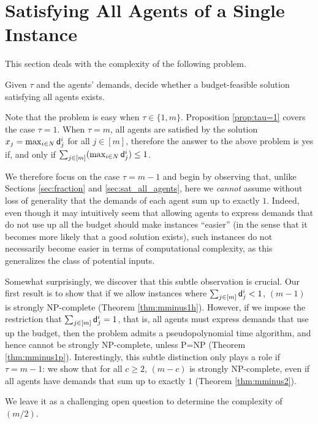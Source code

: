 \documentclass{article}
\begin{document}
\section{Satisfying All Agents of a Single Instance} 

\label{sec:social_welfare_max}

This section deals with the complexity of the following problem. 
\begin{definition}[\AAS$(\tau)$] Given $\tau$ and the agents' demands, decide whether a budget-feasible solution satisfying all agents exists.
\end{definition}


Note that the problem is easy when $\tau \in \{1,m\}$.  Proposition \ref{prop:tau=1} covers the case 
$\tau=1$. When $\tau=m$, all agents are satisfied by  
the solution $x_j=\max_{i \in N} {\sf d}_j^i$ for all $j \in [m]$, therefore the answer to the above problem is yes if, and only if $\sum_{j\in[m]} ( \max_{i \in N} {\sf d}_j^i ) \le 1$.

We therefore focus on the case $\tau=m-1$ and begin by observing that, unlike Sections \ref{sec:fraction} and \ref{sec:sat_all_agents}, here we \emph{cannot} assume without loss of generality that the demands of each agent sum up to exactly $1$. Indeed, even though it may intuitively seem that allowing agents to express demands that do not use up all the budget should make instances ``easier'' (in the sense that it becomes more likely that a good solution exists), such instances do not necessarily become easier in terms of computational complexity, as this generalizes the class of potential inputs. 

Somewhat surprisingly, we discover that this subtle observation is crucial. Our first result is to show that if we allow instances  where $\sum_{j\in [m]} {\sf d}^i_j <1$, \AAS$(m-1)$ is strongly NP-complete (Theorem \ref{thm:mminus1h}). However, if we impose the restriction that $\sum_{j\in [m]} {\sf d}^i_j =1$, that is, all agents must express demands that use up the budget, then the problem admits a pseudopolynomial time algorithm, and hence cannot be strongly NP-complete, unless P=NP (Theorem \ref{thm:mminus1p}). Interestingly, this subtle distinction only plays a role if $\tau=m-1$: we show that for all $c\ge 2$, \AAS$(m-c)$ is strongly NP-complete, even if all agents have demands that sum up to exactly $1$ (Theorem \ref{thm:mminus2}). 

We leave it as a challenging open  question to determine the complexity of \AAS$(m/2)$. 
\end{document}

